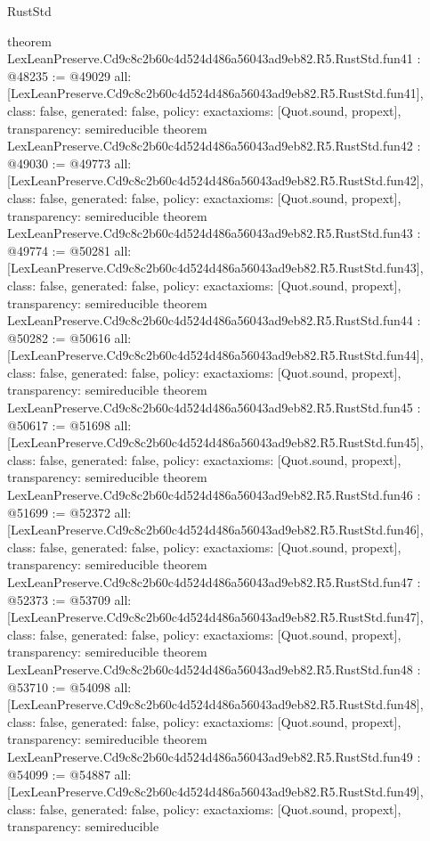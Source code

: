 \begin{lexlean}{RustStd}
\begin{coremodule}
{}
theorem LexLeanPreserve.Cd9c8c2b60c4d524d486a56043ad9eb82.R5.RustStd.fun41 : @48235 := @49029 {
  all: [LexLeanPreserve.Cd9c8c2b60c4d524d486a56043ad9eb82.R5.RustStd.fun41],
  class: false,
  generated: false,
  policy: exact{axioms: [Quot.sound, propext]},
  transparency: semireducible
}
theorem LexLeanPreserve.Cd9c8c2b60c4d524d486a56043ad9eb82.R5.RustStd.fun42 : @49030 := @49773 {
  all: [LexLeanPreserve.Cd9c8c2b60c4d524d486a56043ad9eb82.R5.RustStd.fun42],
  class: false,
  generated: false,
  policy: exact{axioms: [Quot.sound, propext]},
  transparency: semireducible
}
theorem LexLeanPreserve.Cd9c8c2b60c4d524d486a56043ad9eb82.R5.RustStd.fun43 : @49774 := @50281 {
  all: [LexLeanPreserve.Cd9c8c2b60c4d524d486a56043ad9eb82.R5.RustStd.fun43],
  class: false,
  generated: false,
  policy: exact{axioms: [Quot.sound, propext]},
  transparency: semireducible
}
theorem LexLeanPreserve.Cd9c8c2b60c4d524d486a56043ad9eb82.R5.RustStd.fun44 : @50282 := @50616 {
  all: [LexLeanPreserve.Cd9c8c2b60c4d524d486a56043ad9eb82.R5.RustStd.fun44],
  class: false,
  generated: false,
  policy: exact{axioms: [Quot.sound, propext]},
  transparency: semireducible
}
theorem LexLeanPreserve.Cd9c8c2b60c4d524d486a56043ad9eb82.R5.RustStd.fun45 : @50617 := @51698 {
  all: [LexLeanPreserve.Cd9c8c2b60c4d524d486a56043ad9eb82.R5.RustStd.fun45],
  class: false,
  generated: false,
  policy: exact{axioms: [Quot.sound, propext]},
  transparency: semireducible
}
theorem LexLeanPreserve.Cd9c8c2b60c4d524d486a56043ad9eb82.R5.RustStd.fun46 : @51699 := @52372 {
  all: [LexLeanPreserve.Cd9c8c2b60c4d524d486a56043ad9eb82.R5.RustStd.fun46],
  class: false,
  generated: false,
  policy: exact{axioms: [Quot.sound, propext]},
  transparency: semireducible
}
theorem LexLeanPreserve.Cd9c8c2b60c4d524d486a56043ad9eb82.R5.RustStd.fun47 : @52373 := @53709 {
  all: [LexLeanPreserve.Cd9c8c2b60c4d524d486a56043ad9eb82.R5.RustStd.fun47],
  class: false,
  generated: false,
  policy: exact{axioms: [Quot.sound, propext]},
  transparency: semireducible
}
theorem LexLeanPreserve.Cd9c8c2b60c4d524d486a56043ad9eb82.R5.RustStd.fun48 : @53710 := @54098 {
  all: [LexLeanPreserve.Cd9c8c2b60c4d524d486a56043ad9eb82.R5.RustStd.fun48],
  class: false,
  generated: false,
  policy: exact{axioms: [Quot.sound, propext]},
  transparency: semireducible
}
theorem LexLeanPreserve.Cd9c8c2b60c4d524d486a56043ad9eb82.R5.RustStd.fun49 : @54099 := @54887 {
  all: [LexLeanPreserve.Cd9c8c2b60c4d524d486a56043ad9eb82.R5.RustStd.fun49],
  class: false,
  generated: false,
  policy: exact{axioms: [Quot.sound, propext]},
  transparency: semireducible
}
\end{coremodule}
\end{lexlean}
